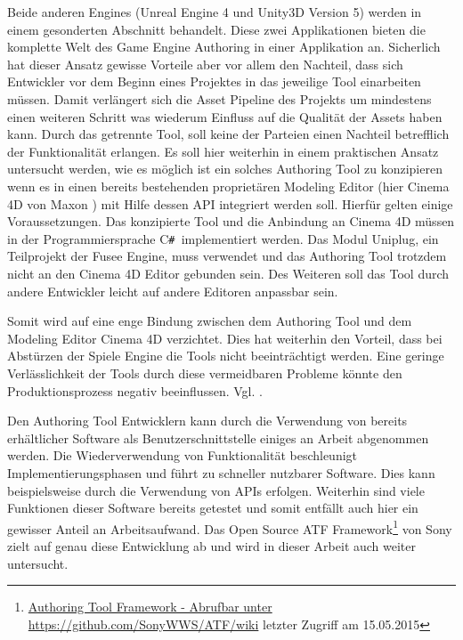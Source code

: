 \documentclass[pagesize, paper=a4, fontsize=12pt, titlepage=true, headings=small, headnosepline, abstractoff, liststotoc, nochapterprefix, plainheadsepline, twoside]{scrreprt}
\newcommand{\CSS}{C\texttt{\# }}
\begin{document}
Beide anderen Engines (Unreal Engine 4 und Unity3D Version 5) werden in einem gesonderten Abschnitt behandelt. Diese zwei Applikationen bieten die komplette Welt des Game Engine Authoring in einer Applikation an. Sicherlich hat dieser Ansatz gewisse Vorteile aber vor allem den Nachteil, dass sich Entwickler vor dem Beginn eines Projektes in das jeweilige Tool einarbeiten müssen. Damit verlängert sich die Asset Pipeline des Projekts um mindestens einen weiteren Schritt was wiederum Einfluss auf die Qualität der Assets haben kann. Durch das getrennte Tool, soll keine der Parteien einen Nachteil betrefflich der Funktionalität erlangen.
Es soll hier weiterhin in einem praktischen Ansatz untersucht werden, wie es möglich ist ein solches Authoring Tool zu konzipieren wenn es in einen bereits bestehenden proprietären Modeling Editor (hier Cinema 4D von Maxon ) mit Hilfe dessen API integriert werden soll. Hierfür gelten einige Voraussetzungen. Das konzipierte Tool und die Anbindung an Cinema 4D müssen in der Programmiersprache \CSS implementiert werden. Das Modul Uniplug, ein Teilprojekt der Fusee Engine, muss verwendet und das Authoring Tool trotzdem nicht an den Cinema 4D Editor gebunden sein. Des Weiteren soll das Tool durch andere Entwickler leicht auf andere Editoren anpassbar sein.

Somit wird auf eine enge Bindung zwischen dem Authoring Tool und dem Modeling Editor Cinema 4D verzichtet. Dies hat weiterhin den Vorteil, dass bei Abstürzen der Spiele Engine die Tools nicht beeinträchtigt werden. Eine geringe Verlässlichkeit der Tools durch diese vermeidbaren Probleme könnte den Produktionsprozess negativ beeinflussen. Vgl. .

Den Authoring Tool Entwicklern kann durch die Verwendung von bereits erhältlicher Software als Benutzerschnittstelle einiges an Arbeit abgenommen werden. Die Wiederverwendung von Funktionalität beschleunigt Implementierungsphasen und führt zu schneller nutzbarer Software. Dies kann beispielsweise durch die Verwendung von APIs erfolgen. Weiterhin sind viele Funktionen dieser Software bereits getestet und somit entfällt auch hier ein gewisser Anteil an Arbeitsaufwand. Das Open Source ATF Framework\footnote{\url{Authoring Tool Framework - Abrufbar unter https://github.com/SonyWWS/ATF/wiki} letzter Zugriff am 15.05.2015} von Sony zielt auf genau diese Entwicklung ab und wird in dieser Arbeit auch weiter untersucht.
\end{document}
